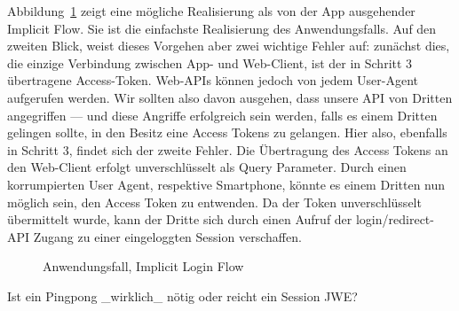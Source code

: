 Abbildung~\ref{ls: Implicit Authorization TK} zeigt eine mögliche Realisierung
als von der App ausgehender Implicit Flow. Sie ist die einfachste Realisierung
des Anwendungsfalls. 
Auf den zweiten Blick, weist dieses Vorgehen aber zwei wichtige Fehler auf:
zunächst dies, die einzige Verbindung zwischen App- und Web-Client, ist der in
Schritt 3 übertragene Access-Token. Web-APIs können jedoch von jedem User-Agent
aufgerufen werden. Wir sollten also davon ausgehen, dass unsere API von Dritten
angegriffen --- und diese Angriffe erfolgreich sein werden, falls es einem
Dritten gelingen sollte, in den Besitz eine Access Tokens zu gelangen. Hier
also, ebenfalls in Schritt 3, findet sich der zweite Fehler. Die Übertragung des
Access Tokens an den Web-Client erfolgt unverschlüsselt als Query Parameter.
Durch einen korrumpierten User Agent, respektive Smartphone, könnte es einem
Dritten nun möglich sein, den Access Token zu entwenden. Da der Token
unverschlüsselt übermittelt wurde, kann der Dritte sich durch einen Aufruf
der login/redirect-API Zugang zu einer eingeloggten Session verschaffen.

\begin{figure}[h]
    \scalebox{.6}{
        
    }
    \caption{Anwendungsfall, Implicit Login Flow}\label{ls: Implicit Authorization TK}
\end{figure}


Ist ein Pingpong _wirklich_ nötig oder reicht ein Session JWE?
